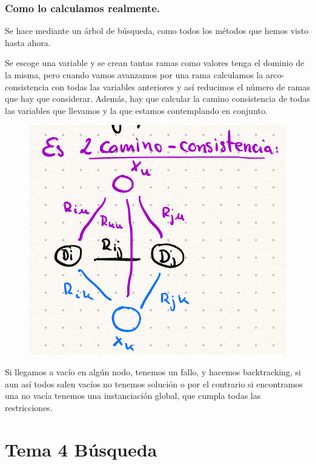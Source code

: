 \documentclass[12pt, twoside, openright]{report} %
\begin{document}
\subsection{Como lo calculamos realmente.}


  Se hace mediante un árbol de búsqueda, como todos los métodos que
  hemos visto hasta ahora.


    Se escoge una variable y se crean tantas ramas como valores tenga el
    dominio de la misma, pero cuando vamos avanzamos por una rama
    calculamos la arco-consistencia con todas las variables anteriores y
    así reducimos el número de ramas que hay que considerar. Además, hay
    que calcular la camino consistencia de todas las variables que
    llevamos y la que estamos contemplando en conjunto.
	\begin{figure}[H]
		{\includegraphics[scale=.23]{Untitled 42.png}}
	\end{figure}    Si llegamos a vacío en algún nodo, tenemos un fallo, y hacemos
    backtracking, si aun así todos salen vacíos no tenemos solución o
    por el contrario si encontramos una no vacía tenemos una
    instanciación global, que cumpla todas las restricciones.

	

\chapter{Tema 4 Búsqueda}
\end{document}
